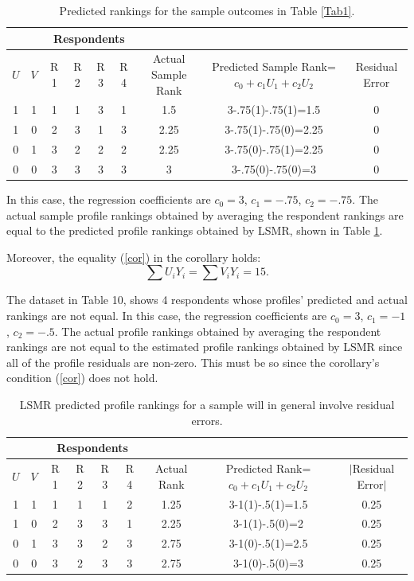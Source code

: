 \documentclass[a4paper, 12pt]{article}
\begin{document}
\begin{table}[!htpb]
\centering
\scriptsize
\begin{tabular}{cc|cccc|c|c|c}
\multicolumn{2}{c}{} &\multicolumn{4}{c}{Respondents}\\\hline
 $U$ & $V$ & R 1&  R 2& R 3& R 4 &Actual Sample Rank&Predicted Sample Rank=$c_0+c_1U_1+c_2U_2$ & Residual Error\\  \hline
1 &1&1&1&3&1&1.5&3-.75(1)-.75(1)=1.5&0\\
1 &0&2&3&1&3&2.25&3-.75(1)-.75(0)=2.25&0 \\
0 &1&3&2&2&2&2.25 &3-.75(0)-.75(1)=2.25&0 \\
0 &0&3&3&3&3& 3 &3-.75(0)-.75(0)=3&0\\\hline
\end{tabular}
\caption{{\small Predicted rankings for the sample outcomes in Table \ref{Tab1}.}}
\label{Tab9}
\end{table}

{\flushleft In} this case, the regression coefficients are
$c_0=3$, $c_1=-.75$, $c_2=-.75$.  The actual sample profile rankings obtained by averaging the respondent rankings are equal to the predicted profile rankings obtained by LSMR, shown in Table \ref{Tab9}.

{\flushleft Moreover}, the equality (\ref{cor}) in the corollary holds: 
$$\sum U_iY_i=\sum V_iY_i = 15.$$

The dataset in Table 10, shows 4 respondents whose profiles' predicted and actual rankings are not equal.  In this case, the regression coefficients are
$c_0=3$, $c_1=-1$, $c_2=-.5$. The actual profile rankings obtained by averaging the respondent rankings are not equal to the estimated profile rankings obtained by LSMR since all of the profile residuals are non-zero. This must be so since the corollary's condition (\ref{cor}) does not hold.
\begin{table}[!htpb]
\centering
\scriptsize
\begin{tabular}{cc|cccc|c|c|c}
\multicolumn{2}{c}{} &\multicolumn{4}{c}{Respondents}\\\hline
 $U$ & $V$ & R 1&  R 2& R 3& R 4 &Actual Rank&Predicted Rank=$c_0+c_1U_1+c_2U_2$ & $|$Residual Error$|$\\  \hline

1 &1&1&1&1&2&1.25&3-1(1)-.5(1)=1.5&0.25\\
1 &0&2&3&3&1&2.25&3-1(1)-.5(0)=2&0.25\\
0 &1&3&3&2&3&2.75 &3-1(0)-.5(1)=2.5&0.25 \\
0 &0&3&2&3&3&2.75 &3-1(0)-.5(0)=3&0.25 \\\hline
\end{tabular}
\caption{{\small LSMR predicted profile rankings for a sample will in general involve residual errors. }}
\label{Tab10}
\end{table}
\end{document}
